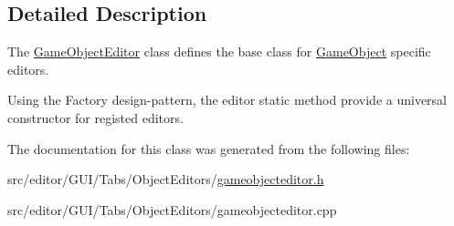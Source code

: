 \subsection{\-Detailed \-Description}
\-The \hyperlink{class_game_object_editor}{\-Game\-Object\-Editor} class defines the base class for \hyperlink{class_game_object}{\-Game\-Object} specific editors. 

\-Using the \-Factory design-\/pattern, the editor static method provide a universal constructor for registed editors. 

\-The documentation for this class was generated from the following files\-:\begin{DoxyCompactItemize}
\item 
src/editor/\-G\-U\-I/\-Tabs/\-Object\-Editors/\hyperlink{gameobjecteditor_8h}{gameobjecteditor.\-h}\item 
src/editor/\-G\-U\-I/\-Tabs/\-Object\-Editors/gameobjecteditor.\-cpp\end{DoxyCompactItemize}
